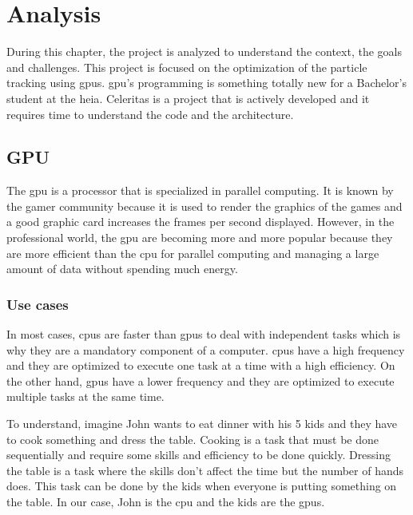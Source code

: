 \chapter{Analysis}
\label{ch:analyze}

During this chapter, the project is analyzed to understand the context, the
goals and challenges.
This project is focused on the optimization of the particle tracking using
\acrshort{gpu}s.
\acrshort{gpu}'s programming is something totally new for a Bachelor's
student at the \acrshort{heia}.
Celeritas is a project that is actively developed and it requires time to
understand the code and the architecture.


\section{GPU}
\label{ch:analyze:gpu}

The \acrfull{gpu} is a processor that is specialized in parallel computing.
It is known by the gamer community because it is used to render the graphics of
the games and a good graphic card increases the frames per second displayed.
However, in the professional world, the \acrshort{gpu} are becoming more and
more popular because they are more efficient than the \acrshort{cpu} for
parallel computing and managing a large amount of data without spending much
energy.


\subsection{Use cases}
\label{ch:analyze:gpu:use-cases}

In most cases, \acrshort{cpu}s are faster than \acrshort{gpu}s to deal with
independent tasks which is why they are a mandatory component of a computer.
\acrshort{cpu}s have a high frequency and they are optimized to execute one
task at a time with a high efficiency.
On the other hand, \acrshort{gpu}s have a lower frequency and they are optimized
to execute multiple tasks at the same time.

To understand, imagine John wants to eat dinner with his 5 kids and they have to
cook something and dress the table.
Cooking is a task that must be done sequentially and require some skills and
efficiency to be done quickly.
Dressing the table is a task where the skills don't affect the time but the
number of hands does.
This task can be done by the kids when everyone is putting something on the table.
In our case, John is the \acrshort{cpu} and the kids are the \acrshort{gpu}s.


